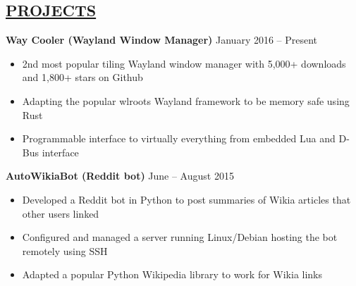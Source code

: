 \documentclass[overlapped,line]{res}
\begin{document}
\begin{resume}
\section{\underline{PROJECTS}}
\textbf{Way Cooler (Wayland Window Manager)} \hfill January 2016 \--- Present
\begin{itemize}  \itemsep -2pt
	\item 2nd most popular tiling Wayland window manager with 5,000+ downloads and 1,800+ stars on Github
	\item Adapting the popular wlroots Wayland framework to be memory safe using Rust
	\item Programmable interface to virtually everything from embedded Lua and D-Bus interface
\end{itemize}

\textbf{AutoWikiaBot (Reddit bot)} \hfill            June \--- August 2015
\begin{itemize}  \itemsep -2pt
	\item Developed a Reddit bot in Python to post summaries of Wikia articles that other users linked
	\item Configured and managed a server running Linux/Debian hosting the bot remotely using SSH
	\item Adapted a popular Python Wikipedia library to work for Wikia links
\end{itemize}

\end{resume}
\end{document}
